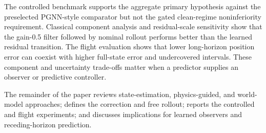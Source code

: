 The controlled benchmark supports the aggregate primary hypothesis against the
preselected PGNN-style comparator but not the gated clean-regime noninferiority
requirement. Classical component analysis and residual-scale sensitivity show
that the gain-0.5 filter followed by nominal rollout performs better than the
learned residual transition. The flight
evaluation shows that lower long-horizon position error can coexist with higher
full-state error and undercovered intervals. These component and uncertainty
trade-offs matter when a predictor supplies an observer or predictive
controller.

The remainder of the paper reviews state-estimation, physics-guided, and world-
model approaches; defines the correction and free rollout; reports the
controlled and flight experiments; and discusses implications for learned
observers and receding-horizon prediction.
